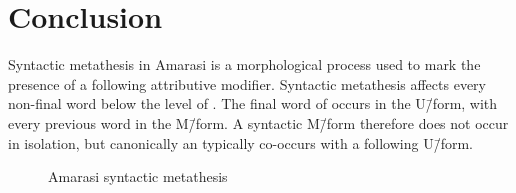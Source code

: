 \section{Conclusion}
Syntactic metathesis in Amarasi is a morphological process
used to mark the presence of a following attributive modifier.
Syntactic metathesis affects every non-final word below the level of .
The final word of  occurs in the U\=/form,
with every previous word in the M\=/form.
A syntactic M\=/form therefore does not occur in isolation,
but canonically an typically co-occurs with a following U\=/form.


\begin{figure}[h]
	\caption{Amarasi syntactic metathesis}\label{fig:AmaSynMet}
\end{figure}